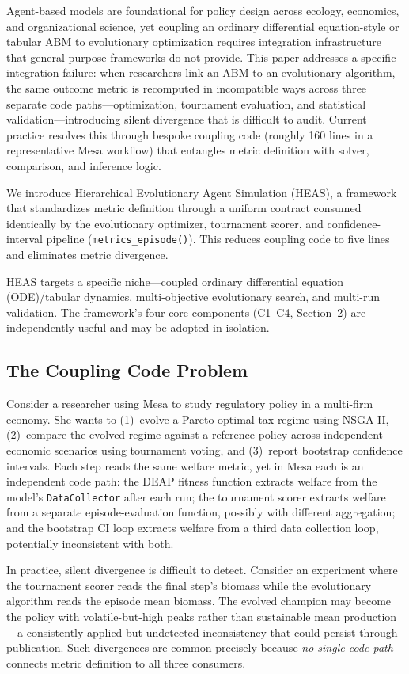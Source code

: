 \documentclass{wscpaperproc}
\begin{document}
Agent-based models are foundational for policy design across ecology,
economics, and organizational science, yet coupling an ordinary differential equation-style or tabular ABM
to evolutionary optimization requires integration infrastructure that
general-purpose frameworks do not provide. This paper addresses a specific
integration failure: when researchers link an ABM to an evolutionary algorithm,
the same outcome metric is recomputed in incompatible ways across three separate
code paths---optimization, tournament evaluation, and statistical
validation---introducing silent divergence that is difficult to audit. Current
practice resolves this through bespoke coupling code (roughly 160 lines in a
representative Mesa workflow) that entangles metric definition with solver,
comparison, and inference logic.

We introduce Hierarchical Evolutionary Agent Simulation (HEAS), a framework that standardizes metric definition through a
uniform contract consumed identically by the evolutionary optimizer, tournament
scorer, and confidence-interval pipeline (\texttt{metrics\_episode()}).
This reduces coupling code to five lines and eliminates metric divergence.

HEAS targets a specific niche---coupled ordinary differential equation (ODE)/tabular dynamics, multi-objective
evolutionary search, and multi-run validation. The framework's four
core components (C1--C4, Section~2) are independently useful and may be adopted
in isolation.

\subsection{The Coupling Code Problem}

Consider a researcher using Mesa to study regulatory policy in a multi-firm
economy. She wants to (1)~evolve a Pareto-optimal tax regime using NSGA-II,
(2)~compare the evolved regime against a reference policy across independent
economic scenarios using tournament voting, and (3)~report bootstrap confidence
intervals. Each step reads the same welfare metric, yet in Mesa each is an
independent code path: the DEAP fitness function extracts welfare from the
model's \texttt{DataCollector} after each run; the tournament scorer extracts
welfare from a separate episode-evaluation function, possibly with different
aggregation; and the bootstrap CI loop extracts welfare from a third data
collection loop, potentially inconsistent with both.

In practice, silent divergence is difficult to detect. Consider an experiment
where the tournament scorer reads the final step's biomass while the
evolutionary algorithm reads the episode mean biomass. The evolved champion may
become the policy with volatile-but-high peaks rather than sustainable mean
production---a consistently applied but undetected inconsistency that could
persist through publication. Such divergences are common precisely because
\emph{no single code path} connects metric definition to all three consumers.
\end{document}
